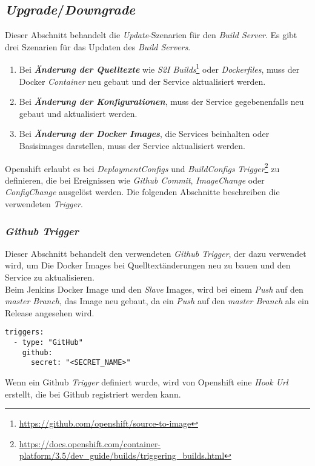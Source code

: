 \subsection{\emph{Upgrade}/\emph{Downgrade}}
\label{sec:buildserver-updates}
Dieser Abschnitt behandelt die \emph{Update}-Szenarien für den \emph{Build Server}. Es gibt drei Szenarien für das Updaten des \emph{Build Servers}.
\begin{enumerate}
	\item Bei \textbf{\emph{Änderung der Quelltexte}} wie \emph{S2I Builds}\footnote{\url{https://github.com/openshift/source-to-image}} oder \emph{Dockerfiles}, muss der Docker \emph{Container} neu gebaut und der Service aktualisiert werden.
	\item Bei \textbf{\emph{Änderung der Konfigurationen}}, muss der Service gegebenenfalls neu gebaut und aktualisiert werden.
	\item Bei \textbf{\emph{Änderung der Docker Images}}, die Services beinhalten oder Basisimages darstellen, muss der Service aktualisiert werden.
\end{enumerate}

Openshift erlaubt es bei \emph{DeploymentConfigs} und \emph{BuildConfigs} \emph{Trigger}\footnote{\url{https://docs.openshift.com/container-platform/3.5/dev_guide/builds/triggering_builds.html}} zu definieren, die bei Ereignissen wie \emph{Github Commit}, \emph{ImageChange} oder \emph{ConfigChange} ausgelöst werden. Die folgenden Abschnitte beschreiben die verwendeten \emph{Trigger}.

\subsubsection{\emph{Github Trigger}}
Dieser Abschnitt behandelt den verwendeten \emph{Github Trigger}, der dazu verwendet wird, um Die Docker Images bei Quelltextänderungen neu zu bauen und den Service zu aktualisieren.\\

Beim Jenkins Docker Image und den \emph{Slave} Images, wird bei einem \emph{Push} auf den \emph{master Branch}, das Image neu gebaut, da ein \emph{Push} auf den \emph{master Branch} als ein Release angesehen wird.

\begin{verbatim}
triggers:
  - type: "GitHub"
    github:
      secret: "<SECRET_NAME>"
\end{verbatim}
Wenn ein Github \emph{Trigger} definiert wurde, wird von Openshift eine \emph{Hook Url} erstellt, die bei Github registriert werden kann.

